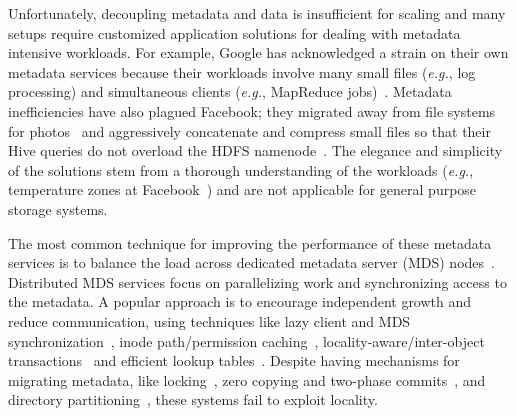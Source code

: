 Unfortunately, decoupling metadata and data is insufficient for scaling and many setups require customized application solutions for dealing with metadata intensive workloads. For example, Google has acknowledged a strain on their own metadata services because their workloads involve many small files ({\it e.g.}, log processing) and simultaneous clients ({\it e.g.}, MapReduce jobs)~\cite{mckusick:acm2010-gfs-evolution}. Metadata inefficiencies have also plagued Facebook; they migrated away from file systems for photos~\cite{beaver:osdi2010-haystack} and aggressively concatenate and compress small files so that their Hive queries do not overload the HDFS namenode~\cite{thusoo:sigmod2010-facebook-infrastructure}. The elegance and simplicity of the solutions stem from a thorough understanding of the workloads ({\it e.g.}, temperature zones at Facebook~\cite{muralidhar:osdi2014-f4}) and are not applicable for general purpose storage systems. 

The most common technique for improving the performance of these metadata services is to balance the load across dedicated metadata server (MDS) nodes~\cite{patil:fast2011-giga+,weil:osdi2006-ceph,weil:sc2004-dyn-metadata,sinnamohideen:atc2010-ursa,xing:sc2009-skyfs}. Distributed MDS services focus on parallelizing work and synchronizing access to the metadata. A popular approach is to encourage independent growth and reduce communication, using techniques like lazy client and MDS synchronization~\cite{patil:fast2011-giga+, ren:sc2014-indexfs, zheng:pdsw2014-batchfs, hildebrand:msst2005-pnfs, zhu:pds2008-hba}, inode path/permission caching~\cite{brandt:mss2003-lh, li:msst2006-dynamic, xing:sc2009-skyfs}, locality-aware/inter-object transactions~\cite{sinnamohideen:atc2010-ursa,zhu:pds2008-hba,ren:atc2013-tablefs, ren:sc2014-indexfs} and efficient lookup tables~\cite{brandt:mss2003-lh, zhu:pds2008-hba}. Despite having mechanisms for migrating metadata, like locking~\cite{sinnamohideen:atc2010-ursa,schmuck:fast2002-gpfs}, zero copying and two-phase commits~\cite{sinnamohideen:atc2010-ursa}, and directory partitioning~\cite{xing:sc2009-skyfs, patil:fast2011-giga+, ren:sc2014-indexfs, weil:osdi2006-ceph}, these systems fail to exploit locality.

